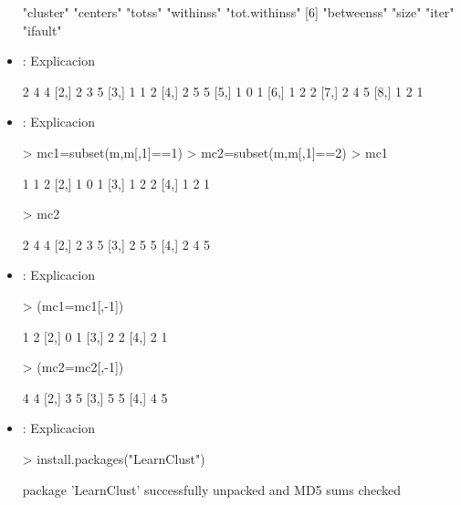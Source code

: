 \documentclass[a4paper, 12pt]{article}
\begin{document}
\begin{itemize}
\begin{Schunk}
\begin{Soutput}
[1] "cluster"      "centers"      "totss"        "withinss"     "tot.withinss"
[6] "betweenss"    "size"         "iter"         "ifault"      
\end{Soutput}
\end{Schunk}
		\item \texttt{}: 
		Explicacion
\begin{Schunk}
\begin{Soutput}
     [,1] [,2] [,3]
[1,]    2    4    4
[2,]    2    3    5
[3,]    1    1    2
[4,]    2    5    5
[5,]    1    0    1
[6,]    1    2    2
[7,]    2    4    5
[8,]    1    2    1
\end{Soutput}
\end{Schunk}
		\item \texttt{}: 
		Explicacion
\begin{Schunk}
\begin{Sinput}
> mc1=subset(m,m[,1]==1)
> mc2=subset(m,m[,1]==2)
> mc1
\end{Sinput}
\begin{Soutput}
     [,1] [,2] [,3]
[1,]    1    1    2
[2,]    1    0    1
[3,]    1    2    2
[4,]    1    2    1
\end{Soutput}
\begin{Sinput}
> mc2
\end{Sinput}
\begin{Soutput}
     [,1] [,2] [,3]
[1,]    2    4    4
[2,]    2    3    5
[3,]    2    5    5
[4,]    2    4    5
\end{Soutput}
\end{Schunk}
		\item \texttt{}: 
		Explicacion
\begin{Schunk}
\begin{Sinput}
> (mc1=mc1[,-1])
\end{Sinput}
\begin{Soutput}
     [,1] [,2]
[1,]    1    2
[2,]    0    1
[3,]    2    2
[4,]    2    1
\end{Soutput}
\begin{Sinput}
> (mc2=mc2[,-1])
\end{Sinput}
\begin{Soutput}
     [,1] [,2]
[1,]    4    4
[2,]    3    5
[3,]    5    5
[4,]    4    5
\end{Soutput}
\end{Schunk}
		\item \texttt{}: 
		Explicacion
\begin{Schunk}
\begin{Sinput}
> install.packages("LearnClust")
\end{Sinput}
\begin{Soutput}
package 'LearnClust' successfully unpacked and MD5 sums checked


\end{Soutput}
\end{Schunk}
\end{itemize}
\end{document}
